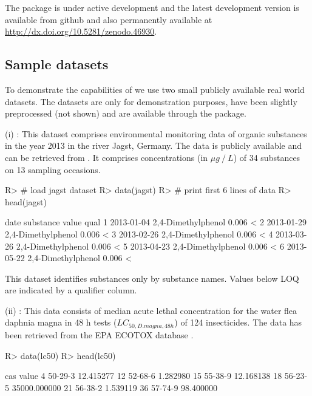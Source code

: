 \documentclass[article, shortnames]{jss}\usepackage[]{graphicx}\usepackage[]{color}
\begin{document}
The package is under active development and the latest development version is available from github and also permanently available at \url{http://dx.doi.org/10.5281/zenodo.46930}.


\subsection[Sample datasets]{Sample datasets}
To demonstrate the capabilities of   we use two small publicly available real world datasets.
The datasets are only for demonstration purposes, have been slightly preprocessed (not shown) and are available through the package.

(i) : This dataset comprises environmental monitoring data of organic substances in the year 2013 in the river Jagst, Germany.
The data is publicly available and can be retrieved from \citep{lubw_2016}.
It comprises concentrations  (in $\mu g~/~L$) of  34 substances  on 13 sampling occasions.

\begin{CodeChunk}
\begin{CodeInput}
R> # load jagst dataset
R> data(jagst)
R> # print first 6 lines of data
R> head(jagst)
\end{CodeInput}
\begin{CodeOutput}
        date          substance value qual
1 2013-01-04 2,4-Dimethylphenol 0.006    <
2 2013-01-29 2,4-Dimethylphenol 0.006    <
3 2013-02-26 2,4-Dimethylphenol 0.006    <
4 2013-03-26 2,4-Dimethylphenol 0.006    <
5 2013-04-23 2,4-Dimethylphenol 0.006    <
6 2013-05-22 2,4-Dimethylphenol 0.006    <
\end{CodeOutput}
\end{CodeChunk}

This dataset identifies substances only by substance names. Values below LOQ are indicated by a qualifier column.

(ii) : This data consists of median acute lethal concentration for the water flea daphnia magna in 48 h tests ($LC_{50, D.magna, 48h}$) of 124 insecticides.
The data has been retrieved from the EPA ECOTOX database \citep{epa_2016}.

\begin{CodeChunk}
\begin{CodeInput}
R> data(lc50)
R> head(lc50)
\end{CodeInput}
\begin{CodeOutput}
       cas        value
4  50-29-3    12.415277
12 52-68-6     1.282980
15 55-38-9    12.168138
18 56-23-5 35000.000000
21 56-38-2     1.539119
36 57-74-9    98.400000
\end{CodeOutput}
\end{CodeChunk}
\end{document}
